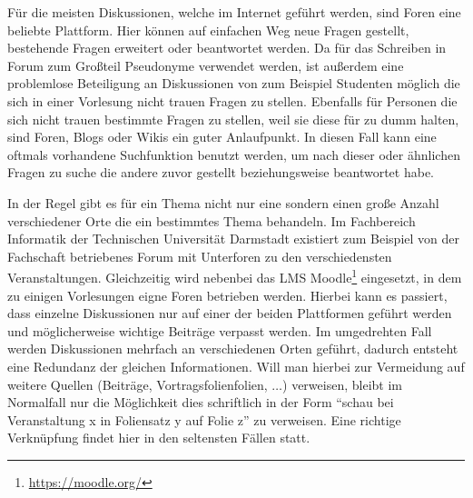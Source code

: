 \medskip

Für die meisten Diskussionen, welche im Internet geführt werden, sind Foren eine beliebte Plattform. Hier können auf einfachen Weg neue Fragen gestellt, bestehende Fragen erweitert oder beantwortet werden. Da für das Schreiben in Forum zum Großteil Pseudonyme verwendet werden, ist außerdem eine problemlose Beteiligung an Diskussionen von zum Beispiel Studenten möglich die sich in einer Vorlesung nicht trauen Fragen zu stellen. Ebenfalls für Personen die sich nicht trauen bestimmte Fragen zu stellen, weil sie diese für zu dumm halten, sind Foren, Blogs oder Wikis ein guter Anlaufpunkt. In diesen Fall kann eine oftmals vorhandene Suchfunktion benutzt werden,  um nach dieser oder ähnlichen Fragen zu suche die andere zuvor gestellt beziehungsweise beantwortet habe.

\medskip


In der Regel gibt es für ein Thema nicht nur eine sondern einen große Anzahl verschiedener Orte die ein bestimmtes Thema behandeln. Im Fachbereich Informatik der Technischen Universität Darmstadt existiert zum Beispiel von der Fachschaft betriebenes Forum mit Unterforen zu den verschiedensten Veranstaltungen. Gleichzeitig wird nebenbei das LMS Moodle\footnote{\url{https://moodle.org/}} eingesetzt, in dem zu einigen Vorlesungen eigne Foren betrieben werden. Hierbei kann es passiert, dass einzelne Diskussionen nur auf einer der beiden Plattformen geführt werden und möglicherweise wichtige Beiträge verpasst werden. Im umgedrehten Fall werden Diskussionen mehrfach an verschiedenen Orten geführt, dadurch entsteht eine Redundanz der gleichen Informationen. Will man hierbei zur Vermeidung auf weitere Quellen (Beiträge, Vortragsfolienfolien, $ \dots $) verweisen, bleibt im Normalfall nur die Möglichkeit dies schriftlich in der Form \enquote{schau bei Veranstaltung x in Foliensatz y auf Folie z} zu verweisen. Eine richtige Verknüpfung findet hier in den seltensten Fällen statt. 






